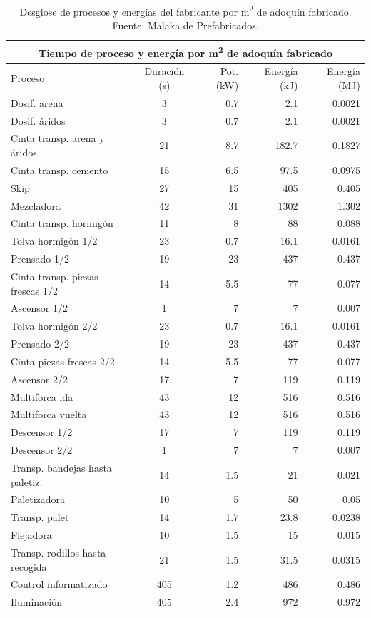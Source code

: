 \begin{table}[!htp]
\centering
\begin{tabular}{lcrrr}
\toprule
\multicolumn{5}{c}{Tiempo de proceso y energía por \si{m^2} de adoquín fabricado}\\
\midrule
Proceso & Duración (\si{s}) & Pot. (\si{kW}) & Energía (\si{kJ}) & Energía (\si{MJ})\\
\midrule
Dosif. arena & 3 & 0.7 & 2.1 & 0.0021\\
Dosif. áridos & 3 & 0.7 & 2.1 & 0.0021\\
Cinta transp. arena y áridos  & 21 & 8.7 & 182.7 & 0.1827\\
Cinta transp. cemento & 15 & 6.5 & 97.5 & 0.0975\\
Skip  & 27 & 15 & 405 & 0.405\\
Mezcladora & 42 & 31 & 1302 & 1.302\\
Cinta transp. hormigón & 11 & 8 & 88 & 0.088\\
Tolva hormigón 1/2 & 23 & 0.7 & 16.1 & 0.0161\\
Prensado 1/2 & 19 & 23 & 437 & 0.437\\
Cinta transp. piezas frescas 1/2 & 14 & 5.5 & 77 & 0.077\\
Ascensor 1/2 & 1 & 7 & 7 & 0.007\\
Tolva hormigón 2/2 & 23 & 0.7 & 16.1 & 0.0161\\
Prensado 2/2 & 19 & 23 & 437 & 0.437\\
Cinta piezas frescas 2/2 & 14 & 5.5 & 77 & 0.077\\
Ascensor 2/2 & 17 & 7 & 119 & 0.119\\
Multiforca ida & 43 & 12 & 516 & 0.516\\
Multiforca vuelta & 43 & 12 & 516 & 0.516\\
Descensor 1/2 & 17 & 7 & 119 & 0.119\\
Descensor 2/2 & 1 & 7 & 7 & 0.007\\
Transp. bandejas hasta paletiz. & 14 & 1.5 & 21 & 0.021\\
Paletizadora & 10 & 5 & 50 & 0.05\\
Transp. palet & 14 & 1.7 & 23.8 & 0.0238\\
Flejadora & 10 & 1.5 & 15 & 0.015\\
Transp. rodillos hasta recogida  & 21 & 1.5 & 31.5 & 0.0315\\
Control informatizado & 405 & 1.2 & 486 & 0.486\\
Iluminación & 405 & 2.4 & 972 & 0.972\\
\bottomrule
\end{tabular}
\caption[Desglose de procesos y energías del fabricante por \si{m^2} de adoquín fabricado.]{Desglose de procesos y energías del fabricante por \si{m^2} de adoquín fabricado. Fuente: Malaka de Prefabricados.}
\label{desgloseenergia}
\end{table}

